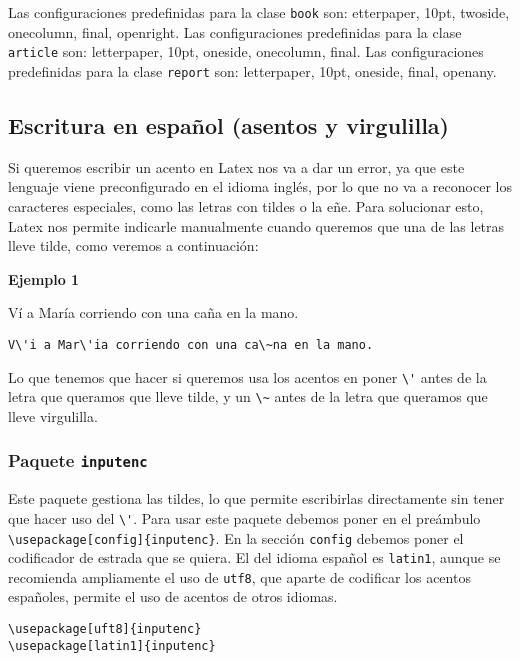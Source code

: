 	Las configuraciones predefinidas para la clase \texttt{book} son: etterpaper, 10pt, twoside, onecolumn, final, openright. Las configuraciones predefinidas para la clase \texttt{article} son: letterpaper, 10pt, oneside, onecolumn, final. Las configuraciones predefinidas para la clase \texttt{report} son: letterpaper, 10pt, oneside, final, openany.
	
	\subsection{Escritura en español (asentos y virgulilla)}
	
	Si queremos escribir un acento en Latex nos va a dar un error, ya que este lenguaje viene preconfigurado en el idioma inglés, por lo que no va a reconocer los caracteres especiales, como las letras con tildes o la eñe. Para solucionar esto, Latex nos permite indicarle manualmente cuando queremos que una de las letras lleve tilde, como veremos a continuación:
	
	\textbf{Ejemplo 1}
	
	V\'i a Mar\'ia corriendo con una ca\~na en la mano.
	\begin{myquote}
		\begin{lstlisting}
V\'i a Mar\'ia corriendo con una ca\~na en la mano.
		\end{lstlisting}
	\end{myquote}
	
	
	Lo que tenemos que hacer si queremos usa los acentos en poner \verb|\'| antes de la letra que queramos que lleve tilde, y un \verb|\~| antes de la letra que queramos que lleve virgulilla.
	
	\subsubsection{Paquete \texttt{inputenc}}
	
	Este paquete gestiona las tildes, lo que permite escribirlas directamente sin tener que hacer uso del \verb|\'|. Para usar este paquete debemos poner en el preámbulo\\  \verb|\usepackage[config]{inputenc}|. En la sección \texttt{config} debemos poner el codificador de estrada que se quiera. El del idioma español es \texttt{latin1}, aunque se recomienda ampliamente el uso de \texttt{utf8}, que aparte de codificar los acentos españoles, permite el uso de acentos de otros idiomas.
	
	\begin{myquote}
		\begin{lstlisting}
\usepackage[uft8]{inputenc}
\usepackage[latin1]{inputenc}
		\end{lstlisting}
	\end{myquote}
		
